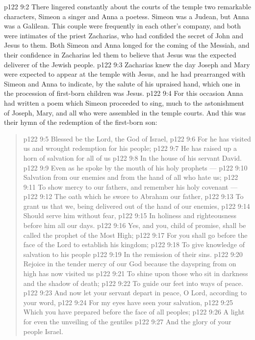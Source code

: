 \vs p122 9:2 \pc There lingered constantly about the courts of the temple two remarkable characters, Simeon a singer and Anna a poetess. Simeon was a Judean, but Anna was a Galilean. This couple were frequently in each other’s company, and both were intimates of the priest Zacharias, who had confided the secret of John and Jesus to them. Both Simeon and Anna longed for the coming of the Messiah, and their confidence in Zacharias led them to believe that Jesus was the expected deliverer of the Jewish people.
\vs p122 9:3 Zacharias knew the day Joseph and Mary were expected to appear at the temple with Jesus, and he had prearranged with Simeon and Anna to indicate, by the salute of his upraised hand, which one in the procession of first\hyp{}born children was Jesus.
\vs p122 9:4 For this occasion Anna had written a poem which Simeon proceeded to sing, much to the astonishment of Joseph, Mary, and all who were assembled in the temple courts. And this was their hymn of the redemption of the first\hyp{}born son:
\begin{quote}
\vs p122 9:5 Blessed be the Lord, the God of Israel,
\vs p122 9:6 For he has visited us and wrought redemption for his people;
\vs p122 9:7 He has raised up a horn of salvation for all of us
\vs p122 9:8 In the house of his servant David.
\vs p122 9:9 Even as he spoke by the mouth of his holy prophets ---
\vs p122 9:10 Salvation from our enemies and from the hand of all who hate us;
\vs p122 9:11 To show mercy to our fathers, and remember his holy covenant ---
\vs p122 9:12 The oath which he swore to Abraham our father,
\vs p122 9:13 To grant us that we, being delivered out of the hand of our enemies,
\vs p122 9:14 Should serve him without fear,
\vs p122 9:15 In holiness and righteousness before him all our days.
\vs p122 9:16 Yes, and you, child of promise, shall be called the prophet of the Most High;
\vs p122 9:17 For you shall go before the face of the Lord to establish his kingdom;
\vs p122 9:18 To give knowledge of salvation to his people
\vs p122 9:19 In the remission of their sins.
\vs p122 9:20 Rejoice in the tender mercy of our God because the dayspring from on high has now visited us
\vs p122 9:21 To shine upon those who sit in darkness and the shadow of death;
\vs p122 9:22 To guide our feet into ways of peace.
\vs p122 9:23 And now let your servant depart in peace, O Lord, according to your word,
\vs p122 9:24 For my eyes have seen your salvation,
\vs p122 9:25 Which you have prepared before the face of all peoples;
\vs p122 9:26 A light for even the unveiling of the gentiles
\vs p122 9:27 And the glory of your people Israel.
\end{quote}
